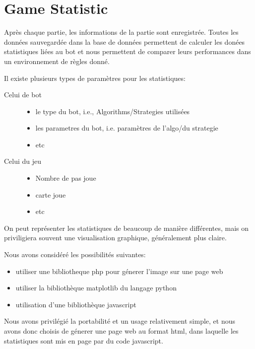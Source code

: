\section{Game Statistic}

Après chaque partie, les informations de la partie sont enregistrée. Toutes les données sauvegardée dans la base de données permettent de calculer les donées statistiques liées au bot et nous permettent de comparer leurs performances dans un environnement de règles donné.

Il existe plusieurs types de paramètres pour les statistiques:\\

\begin{description}
\item[Celui de bot]
  \begin{itemize}
  \item le type du bot, i.e., Algorithms/Strategies utilisées
  \item les parametres du bot, i.e. paramètres de l'algo/du strategie
  \item etc
  \end{itemize}
\item[Celui du jeu]
  \begin{itemize}
  \item Nombre de pas joue
  \item carte joue
  \item etc
  \end{itemize}
\end{description}

On peut représenter les statistiques de beaucoup de manière différentes, mais on priviligiera souvent une visualisation graphique, généralement plus claire.

Nous avons considéré les possibilités suivantes:\\
\begin{itemize}
\item utiliser une bibliotheque php pour génerer l'image sur une page web
\item utiliser la bibliothèque matplotlib du langage python
\item utilisation d'une bibliothèque javascript
\end{itemize}

Nous avons privilégié la portabilité et un usage relativement simple, et nous avons donc choisis de génerer une page web au format html, dans laquelle les statistiques sont mis en page par du code javascript.


